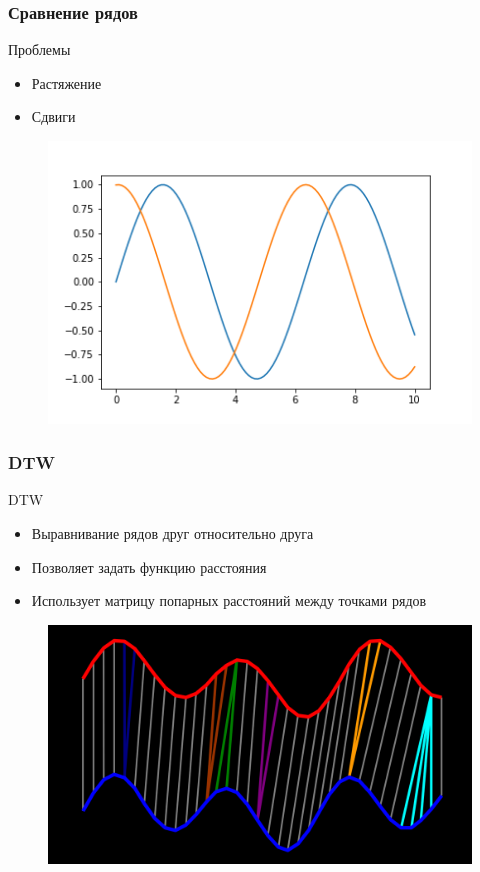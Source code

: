 \documentclass{beamer}
\begin{document}
\begin{frame}
\frametitle{Сравнение рядов}
    \begin{block}{Проблемы}
        \begin{itemize}
            \item Растяжение
            \item Сдвиги
        \end{itemize}
    \end{block}
    \begin{figure}
        \includegraphics[width=0.6\linewidth]{2}
    \end{figure}
\end{frame}


\begin{frame}
\frametitle{DTW}
    \begin{block}{DTW}
        \begin{itemize}
            \item Выравнивание рядов друг относительно друга
            \item Позволяет задать функцию расстояния
            \item Использует матрицу попарных расстояний между точками рядов
        \end{itemize} 
    \end{block}
    \begin{figure}
        \includegraphics[width=0.6\linewidth]{1}
    \end{figure}
\end{frame}
\end{document}
